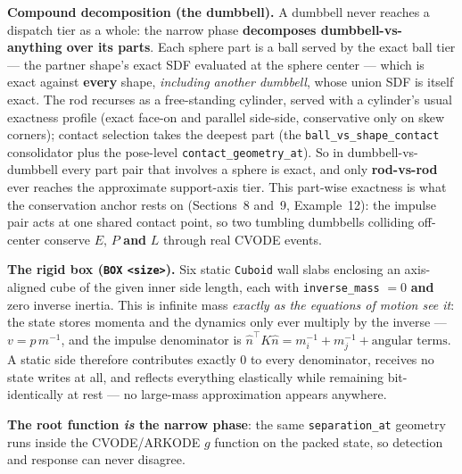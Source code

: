 \documentclass[11pt]{article}
\newcommand{\kw}[1]{\texttt{\uppercase{#1}}}
\newcommand{\code}[1]{\texttt{#1}}
\begin{document}
\textbf{Compound decomposition (the dumbbell).} A dumbbell never reaches a
dispatch tier as a whole: the narrow phase \textbf{decomposes
dumbbell-vs-anything over its parts}. Each sphere part is a ball served by
the exact ball tier --- the partner shape's exact SDF evaluated at the
sphere center --- which is exact against \textbf{every} shape,
\emph{including another dumbbell}, whose union SDF is itself exact. The rod
recurses as a free-standing cylinder, served with a cylinder's usual
exactness profile (exact face-on and parallel side-side, conservative only
on skew corners); contact selection takes the deepest part (the
\code{ball\_vs\_shape\_contact} consolidator plus the pose-level
\code{contact\_geometry\_at}). So in dumbbell-vs-dumbbell every part pair
that involves a sphere is exact, and only \textbf{rod-vs-rod} ever reaches
the approximate support-axis tier. This part-wise exactness is what the
conservation anchor rests on (Sections~8 and~9, Example~12): the impulse
pair acts at one shared contact point, so two tumbling dumbbells colliding
off-center conserve $E$, $P$ \textbf{and} $L$ through real CVODE events.

\textbf{The rigid box (\kw{box} \code{<size>}).} Six static \code{Cuboid}
wall slabs enclosing an axis-aligned cube of the given inner side length,
each with \code{inverse\_mass} $= 0$ \textbf{and} zero inverse inertia. This
is infinite mass \emph{exactly as the equations of motion see it}: the state
stores momenta and the dynamics only ever multiply by the inverse ---
$v = p\,m^{-1}$, and the impulse denominator is
$\hat n^{\!\top} K \hat n = m_i^{-1} + m_j^{-1} + \text{angular terms}$. A
static side therefore contributes exactly 0 to every denominator, receives
no state writes at all, and reflects everything elastically while remaining
bit-identically at rest --- no large-mass approximation appears anywhere.

\textbf{The root function \emph{is} the narrow phase}: the same
\code{separation\_at} geometry runs inside the CVODE/ARKODE $g$ function on the
packed state, so detection and response can never disagree.
\end{document}
